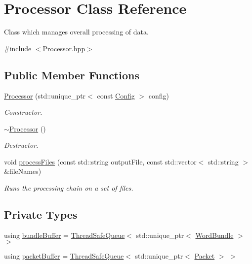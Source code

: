 \hypertarget{class_processor}{}\section{Processor Class Reference}
\label{class_processor}


Class which manages overall processing of data.  




{\ttfamily \#include $<$Processor.\+hpp$>$}

\subsection*{Public Member Functions}
\begin{DoxyCompactItemize}
\item 
\hyperlink{class_processor_a1cc4421ebb02f40665336598c1334c55}{Processor} (std\+::unique\+\_\+ptr$<$ const \hyperlink{class_config}{Config} $>$ config)
\begin{DoxyCompactList}\small\item\em Constructor. \end{DoxyCompactList}\item 
\hyperlink{class_processor_acf37952c5b420d4e903a512571678692}{$\sim$\+Processor} ()
\begin{DoxyCompactList}\small\item\em Destructor. \end{DoxyCompactList}\item 
void \hyperlink{class_processor_a18f7d93604ac0b8c53aea579330538dc}{process\+Files} (const std\+::string output\+File, const std\+::vector$<$ std\+::string $>$ \&file\+Names)
\begin{DoxyCompactList}\small\item\em Runs the processing chain on a set of files. \end{DoxyCompactList}\end{DoxyCompactItemize}
\subsection*{Private Types}
\begin{DoxyCompactItemize}
\item 
using \hyperlink{class_processor_a531b4c5f7c0d810fc6e9e1dd3d115725}{bundle\+Buffer} = \hyperlink{class_thread_safe_queue}{Thread\+Safe\+Queue}$<$ std\+::unique\+\_\+ptr$<$ \hyperlink{class_word_bundle}{Word\+Bundle} $>$ $>$
\item 
using \hyperlink{class_processor_a0cfd8ed0721769db91c142a19a392e0f}{packet\+Buffer} = \hyperlink{class_thread_safe_queue}{Thread\+Safe\+Queue}$<$ std\+::unique\+\_\+ptr$<$ \hyperlink{class_packet}{Packet} $>$ $>$
\end{DoxyCompactItemize}
